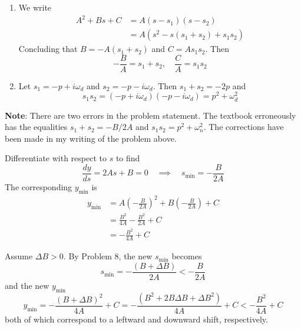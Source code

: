 \documentclass[a4paper]{article}
\begin{document}
\begin{enumerate}[label=(\alph*)]
	\item We write
	\begin{align*}
		A^{2} + Bs + C & = A \!\left( s - s_{1} \right) \!\left( s - s_{2} \right)  \\
		 & = A \!\left( s^{2} - s \!\left( s_{1} + s_{2} \right) + s_{1}s_{2} \right)  
	\end{align*}
	Concluding that \(B = -A\!\left( s_{1} + s_{2} \right) \) and \(C = As_{1}s_{2}\). Then
	\[
		-\frac{B}{A} = s_{1} + s_{2}, \quad \frac{C}{A} = s_{1}s_{2}
	\]
	\item Let \(s_{1} = -p + i \omega_{d}\) and \(s_{2} = -p - i \omega_{d}\). Then \(s_{1} + s_{2} = -2p\) and
	\[
		s_{1}s_{2} = \!\left( -p + i \omega_{d} \right) \!\left( -p - i \omega_{d} \right) = p^{2} + \omega^{2}_{d}
	\]
\end{enumerate}
\textbf{Note}: There are two errors in the problem statement. The textbook erroneously has the equalities \(s_{1} + s_{2} = -B/2A\) and \(s_{1}s_{2} = p^{2} + \omega^{2}_{n}\). The corrections have been made in my writing of the problem above.

\vspace{12pt}


Differentiate with respect to \(s\) to find
\[
	\frac{d y}{d s} = 2As + B = 0 \quad \implies \quad s_{\text{min}} = -\frac{B}{2A}
\]
The corresponding \(y_{\text{min}}\) is
\begin{align*}
	y_{\text{min}} & = A \!\left( - \frac{B}{2A} \right)^{2} + B \!\left( -\frac{B}{2A} \right) + C \\
		   & = \frac{B^{2}}{4A} - \frac{B^{2}}{2A} + C \\
		   & = -\frac{B^{2}}{4A} + C
\end{align*}


Assume \(\Delta B > 0\). By Problem 8, the new \(s_{\text{min}}\) becomes
\[
	s_{\text{min}} = -\frac{\!\left( B + \Delta B \right) }{2A} < -\frac{B}{2A}
\]
and the new \(y_{\text{min}}\)
\[
	y_{\text{min}} = -\frac{\!\left( B + \Delta B \right)^{2}}{4A} + C = -\frac{\!\left( B^{2} + 2B \Delta B + \Delta B^{2} \right) }{4A} + C < -\frac{B^{2}}{4A} + C
\]
both of which correspond to a leftward and downward shift, respectively.
\end{document}
